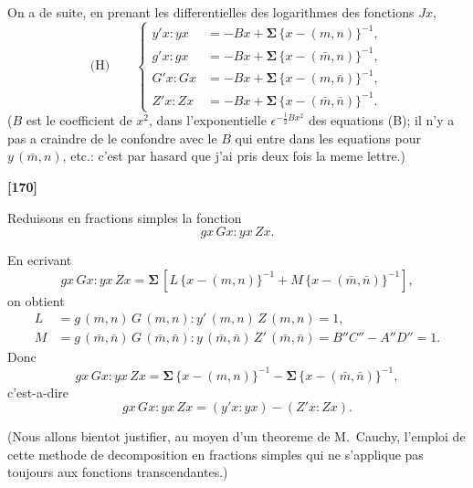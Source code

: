 \documentclass[11pt,a4paper]{article}
\begin{document}
On a de suite, en prenant les differentielles des logarithmes des fonctions $Jx$,
\begin{equation*}
\text{(H)}\qquad
\left\{
\begin{aligned}
y'x : yx &= -Bx + \boldsymbol{\Sigma}\, \{x - (m, n)\}^{-1},\\
g'x : gx &= -Bx + \boldsymbol{\Sigma}\, \{x - (\bar{m}, n)\}^{-1},\\
G'x : Gx &= -Bx + \boldsymbol{\Sigma}\, \{x - (m, \bar{n})\}^{-1},\\
Z'x : Zx &= -Bx + \boldsymbol{\Sigma}\, \{x - (\bar{m}, \bar{n})\}^{-1}.
\end{aligned}
\right.
\end{equation*}
($B$ est le coefficient de $x^2$, dans l'exponentielle $\epsilon^{-\frac{1}{2}Bx^2}$ des equations (B); il n'y a pas
a craindre de le confondre avec le $B$ qui entre dans les equations pour $y\, (\bar{m}, n)$, etc.:
c'est par hasard que j'ai pris deux fois la meme lettre.)

\textbf{[170]}

Reduisons en fractions simples la fonction
\[gx\, Gx : yx\, Zx.\]

En ecrivant
\[gx\, Gx : yx\, Zx = \boldsymbol{\Sigma}\, [L\, \{x - (m, n)\}^{-1} + M\, \{x - (\bar{m}, \bar{n})\}^{-1}],\]
on obtient
\begin{align*}
L &= g\, (m, n)\, G\, (m, n) : y'\, (m, n)\, Z\, (m, n) = 1,\\
M &= g\, (\bar{m}, \bar{n})\, G\, (\bar{m}, \bar{n}) : y\, (\bar{m}, \bar{n})\, Z'\, (\bar{m}, \bar{n}) = B''C'' - A''D'' = 1.
\end{align*}
Donc
\[gx\, Gx : yx\, Zx = \boldsymbol{\Sigma}\, \{x - (m, n)\}^{-1} - \boldsymbol{\Sigma}\, \{x - (\bar{m}, \bar{n})\}^{-1},\]
c'est-a-dire
\[gx\, Gx : yx\, Zx = (y'x : yx) - (Z'x : Zx).\]

(Nous allons bientot justifier, au moyen d'un theoreme de M.~Cauchy, l'emploi de
cette methode de decomposition en fractions simples qui ne s'applique pas toujours aux
fonctions transcendantes.)
\end{document}
